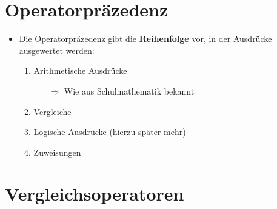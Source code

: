 \section{Operatorpräzedenz}
\begin{frame}
    \slidehead

    \pause
    \pause
    \begin{itemize}
        \item Die Operatorpräzedenz gibt die \textbf{Reihenfolge} vor, in der Ausdrücke ausgewertet werden:
            \begin{enumerate}
                \item Arithmetische Ausdrücke
                    \begin{itemize}
                        \item[$\Rightarrow$] Wie aus Schulmathematik bekannt
                    \end{itemize}
                \item Vergleiche
                \item Logische Ausdrücke (hierzu später mehr)
                \item Zuweisungen
            \end{enumerate}
    \end{itemize}
\end{frame}

\livecoding

\section{Vergleichsoperatoren}
